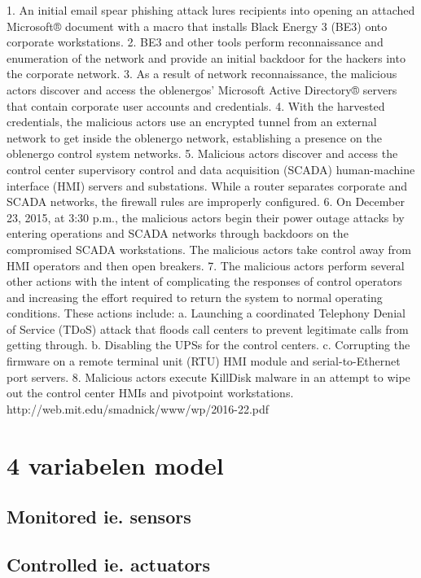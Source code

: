 \documentclass[11pt]{report}
\begin{document}
1. An initial email spear phishing attack lures recipients
into opening an attached Microsoft® document with a
macro that installs Black Energy 3 (BE3) onto
corporate workstations.
2. BE3 and other tools perform reconnaissance and
enumeration of the network and provide an initial
backdoor for the hackers into the corporate network.
3. As a result of network reconnaissance, the malicious
actors discover and access the oblenergos’ Microsoft
Active Directory® servers that contain corporate user
accounts and credentials.
4. With the harvested credentials, the malicious actors use
an encrypted tunnel from an external network to get
inside the oblenergo network, establishing a presence
on the oblenergo control system networks.
5. Malicious actors discover and access the control center
supervisory control and data acquisition (SCADA)
human-machine interface (HMI) servers and
substations. While a router separates corporate and
SCADA networks, the firewall rules are improperly
configured.
6. On December 23, 2015, at 3:30 p.m., the malicious
actors begin their power outage attacks by entering
operations and SCADA networks through backdoors on
the compromised SCADA workstations. The malicious
actors take control away from HMI operators and then
open breakers.
7. The malicious actors perform several other actions with
the intent of complicating the responses of control
operators and increasing the effort required to return the
system to normal operating conditions. These actions
include:
a. Launching a coordinated Telephony Denial of
Service (TDoS) attack that floods call centers to
prevent legitimate calls from getting through.
b. Disabling the UPSs for the control centers.
c. Corrupting the firmware on a remote terminal unit
(RTU) HMI module and serial-to-Ethernet port
servers.
8. Malicious actors execute KillDisk malware in an
attempt to wipe out the control center HMIs and pivotpoint workstations.
http://web.mit.edu/smadnick/www/wp/2016-22.pdf 


\section{4 variabelen model}

\subsection{Monitored ie. sensors}


\subsection{Controlled ie. actuators}
\end{document}
